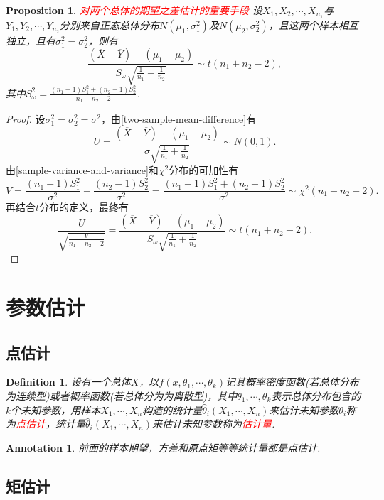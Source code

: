 \documentclass{article}
\newtheorem{proposition}[theorem]{Proposition}
\newtheorem{definition}[theorem]{Definition}
\newtheorem{annotation}[theorem]{Annotation}
\newcommand{\redt}[1]{\textcolor{red}{#1}}
\begin{document}
\begin{proposition}
\rm \redt{对两个总体的期望之差估计的重要手段} 设$X_1,X_2,\cdots,X_{n_1}$与$Y_1,Y_2,\cdots,Y_{n_2}$分别来自正态总体分布$N(\mu_1,\sigma_1^2)$及$N(\mu_2,\sigma_2^2)$，且这两个样本相互独立，且有$\sigma_1^2 = \sigma_2^2$，则有
$$
\frac{(\overline{X} - \overline{Y})-(\mu_1-\mu_2)}{S_\omega\sqrt{\frac{1}{n_1} + \frac{1}{n_2}}}\sim t(n_1+n_2-2),
$$
其中$S_\omega^2 = \frac{(n_1-1)S_1^2+(n_2-1)S_2^2}{n_1+n_2-2}$. 
\end{proposition}

\begin{proof}
设$\sigma_1^2 = \sigma_2^2 = \sigma^2$，由\ref{two-sample-mean-difference}有
$$
U = \frac{(\overline{X} - \overline{Y})-(\mu_1-\mu_2)}{\sigma\sqrt{\frac{1}{n_1} + \frac{1}{n_2}}} \sim N(0,1).
$$
由\ref{sample-variance-and-variance}和$\chi^2$分布的可加性有
$$
V = \frac{(n_1-1)S_1^2}{\sigma^2} + \frac{(n_2-1)S_2^2}{\sigma^2} = \frac{(n_1-1)S_1^2+(n_2-1)S_2^2}{\sigma^2} \sim \chi^2(n_1+n_2-2).   
$$
再结合$t$分布的定义，最终有
$$
\frac{U}{\sqrt{\frac{V}{n_1+n_2-2}}} = \frac{(\overline{X} - \overline{Y})-(\mu_1-\mu_2)}{S_\omega\sqrt{\frac{1}{n_1} + \frac{1}{n_2}}} \sim t(n_1+n_2-2). 
$$
\end{proof}

\newpage
\section{参数估计}

\subsection{点估计}

\begin{definition}
\rm 设有一个总体$X$，以$f(x,\theta_1,\cdots,\theta_k)$记其概率密度函数(若总体分布为连续型)或者概率函数(若总体分为为离散型)，其中$\theta_1,\cdots,\theta_k$表示总体分布包含的$k$个未知参数，用样本$X_1,\cdots,X_n$构造的统计量$\widehat{\theta}_i(X_1,\cdots,X_n)$来估计未知参数$\theta_i$称为\redt{点估计}，统计量$\widehat{\theta}_i(X_1,\cdots,X_n)$来估计未知参数称为\redt{估计量}.
\end{definition}

\begin{annotation}
\rm 前面的样本期望，方差和原点矩等等统计量都是点估计. 
\end{annotation}

\subsection{矩估计}
\end{document}
